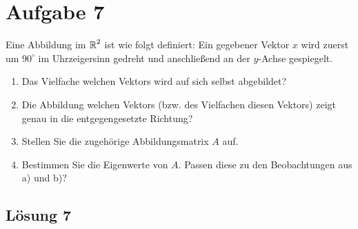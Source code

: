 \documentclass[main.tex]{subfiles}
\begin{document}
\section{Aufgabe 7}
Eine Abbildung im $\operatorname{\mathbb{R}}^2$ ist wie folgt definiert:
Ein gegebener Vektor $x$ wird zuerst um $90^\circ$ im Uhrzeigersinn gedreht und anschließend an der $y$-Achse gespiegelt.
\begin{enumerate}
    \item Das Vielfache welchen Vektors wird auf sich selbst abgebildet?
    \item Die Abbildung welchen Vektors (bzw. des Vielfachen diesen Vektors) zeigt genau in die entgegengesetzte Richtung?
    \item Stellen Sie die zugehörige Abbildungsmatrix $A$ auf.
    \item Bestimmen Sie die Eigenwerte von $A$. Passen diese zu den Beobachtungen aus a) und b)?
\end{enumerate}

\subsection{Lösung 7}
\end{document}
